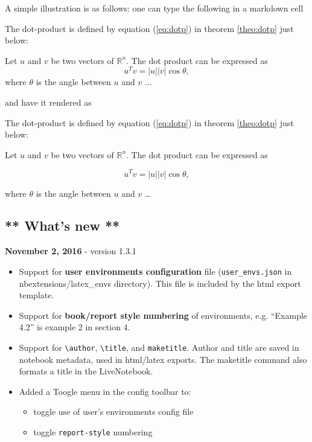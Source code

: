 A simple illustration is as follows: one can type the following in a
markdown cell

\begin{listing}
The dot-product is defined by equation (\ref{eq:dotp}) in theorem \ref{theo:dotp} just below:
\begin{theorem} \label{theo:dotp}
Let $u$ and $v$ be two vectors of $\mathbb{R}^n$. The dot product can be expressed as
\begin{equation}
\label{eq:dotp}
u^Tv = |u||v| \cos \theta,
\end{equation}
where $\theta$ is the angle between $u$ and $v$ ...
\end{theorem}
\end{listing}

and have it rendered as

The dot-product is defined by equation (\ref{eq:dotp}) in theorem
\ref{theo:dotp} just below: \begin{theorem}
\label{theo:dotp} Let \(u\) and \(v\) be two vectors of
\(\mathbb{R}^n\). The dot product can be expressed as

\begin{equation}
\label{eq:dotp}
u^Tv = |u||v| \cos \theta,
\end{equation}

where \(\theta\) is the angle between \(u\) and \(v\) \ldots{}
\end{theorem}

    \subsection{** What's new **}\label{whats-new}

\textbf{November 2, 2016} - version 1.3.1

\begin{itemize}
\tightlist
\item
  Support for \textbf{user environments configuration} file
  (\texttt{user\_envs.json} in nbextensions/latex\_envs directory). This
  file is included by the html export template.\\
\item
  Support for \textbf{book/report style numbering} of environments, e.g.
  ``Example 4.2'' is example 2 in section 4.
\item
  Support for \texttt{\textbackslash{}author},
  \texttt{\textbackslash{}title}, and \texttt{maketitle}. Author and
  title are saved in notebook metadata, used in html/latex exports. The
  maketitle command also formats a title in the LiveNotebook.\\
\item
  Added a Toogle menu in the config toolbar to:

  \begin{itemize}
  \tightlist
  \item
    toggle use of user's environments config file
  \item
    toggle \texttt{report-style} numbering
  \end{itemize}
\end{itemize}

